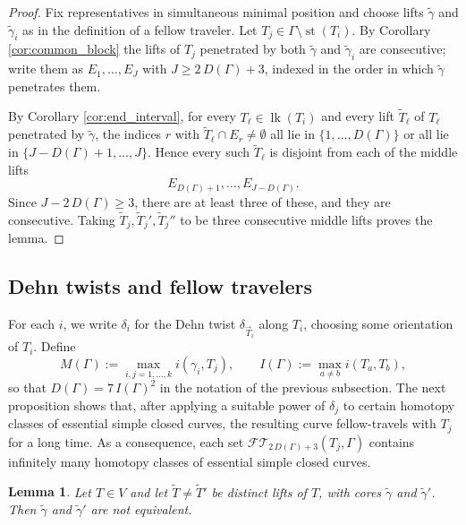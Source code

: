 \documentclass[12pt,a4paper]{amsart}
\numberwithin{equation}{section}
\theoremstyle{plain}
\newtheorem{lemma}[theorem]{Lemma}
\theoremstyle{definition}
\theoremstyle{remark}
\begin{document}
\begin{proof}
    Fix representatives in simultaneous minimal position and choose lifts $\tilde\gamma$ and $\tilde\gamma_i$ as in the definition of a fellow traveler.
    Let $T_j \in \Gamma \setminus \operatorname{st}(T_i)$.
    By Corollary \ref{cor:common_block} the lifts of $T_j$ penetrated by both $\tilde\gamma$ and $\tilde\gamma_i$ are consecutive; write them as $E_1, \ldots, E_J$ with $J \ge 2\,D(\Gamma) + 3$, indexed in the order in which $\tilde\gamma$ penetrates them.

    By Corollary \ref{cor:end_interval}, for every $T_\ell \in \operatorname{lk}(T_i)$ and every lift $\tilde T_\ell$ of $T_\ell$ penetrated by $\tilde\gamma$, the indices $r$ with $\tilde T_\ell \cap E_r \ne \emptyset$ all lie in $\{1, \ldots, D(\Gamma)\}$ or all lie in $\{J - D(\Gamma) + 1, \ldots, J\}$.
    Hence every such $\tilde T_\ell$ is disjoint from each of the middle lifts
    \[
        E_{D(\Gamma)+1}, \ldots, E_{J - D(\Gamma)} .
    \]
    Since $J - 2\,D(\Gamma) \ge 3$, there are at least three of these, and they are consecutive.
    Taking $\tilde T_j, \tilde T_j', \tilde T_j''$ to be three consecutive middle lifts proves the lemma.
\end{proof}

\subsection{Dehn twists and fellow travelers}

For each \(i\), we write \(\delta_i\) for the Dehn twist \(\delta_{\vec{T}_i}\) along \(T_i\), choosing some orientation of \(T_i\).
Define
\[
    M(\Gamma) := \max_{i, j = 1, \dots, k} i(\gamma_i, T_j),
    \qquad
    I(\Gamma) := \max_{a \ne b} i(T_a, T_b),
\]
so that $D(\Gamma) = 7\, I(\Gamma)^2$ in the notation of the previous subsection.
The next proposition shows that, after applying a suitable power of \(\delta_j\) to certain homotopy classes of essential simple closed curves, the resulting curve fellow-travels with \(T_j\) for a long time.
As a consequence, each set \(\mathcal{FT}\!_{2\,D(\Gamma)+3}(T_j,\Gamma)\) contains infinitely many homotopy classes of essential simple closed curves.

\begin{lemma} \label{lem:core_lifts_inequivalent}
    Let $T \in V$ and let $\tilde T \ne \tilde T'$ be distinct lifts of $T$, with cores $\tilde\gamma$ and $\tilde\gamma'$.
    Then $\tilde\gamma$ and $\tilde\gamma'$ are not equivalent.
\end{lemma}
\end{document}
